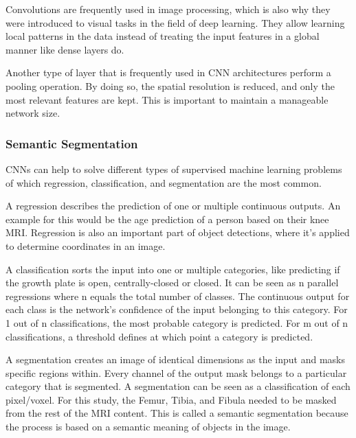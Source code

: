 Convolutions are frequently used in image processing, which is also why they were introduced to visual tasks in the field of deep learning. They allow learning local patterns in the data instead of treating the input features in a global manner like dense layers do.

Another type of layer that is frequently used in CNN architectures perform a pooling operation. By doing so, the spatial resolution is reduced, and only the most relevant features are kept. This is important to maintain a manageable network size.

\subsubsection{Semantic Segmentation}

CNNs can help to solve different types of supervised machine learning problems of which regression, classification, and segmentation are the most common.

A regression describes the prediction of one or multiple continuous outputs. An example for this would be the age prediction of a person based on their knee MRI. Regression is also an important part of object detections, where it's applied to determine coordinates in an image.

A classification sorts the input into one or multiple categories, like predicting if the growth plate is open, centrally-closed or closed. It can be seen as n parallel regressions where n equals the total number of classes. The continuous output for each class is the network's confidence of the input belonging to this category. For 1 out of n classifications, the most probable category is predicted. For m out of n classifications, a threshold defines at which point a category is predicted.

A segmentation creates an image of identical dimensions as the input and masks specific regions within. Every channel of the output mask belongs to a particular category that is segmented. A segmentation can be seen as a classification of each pixel/voxel. For this study, the Femur, Tibia, and Fibula needed to be masked from the rest of the MRI content. This is called a semantic segmentation because the process is based on a semantic meaning of objects in the image.

